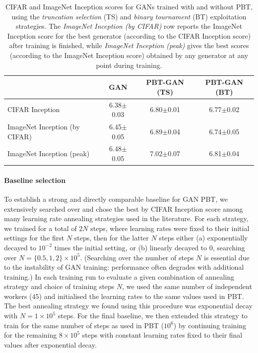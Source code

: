 \begin{appendices}
\begin{table}
    \begin{center}
    \begin{tabular}{lccc}
    \toprule
                                  & \bf{GAN}           & \bf{PBT-GAN (TS)}  & \bf{PBT-GAN (BT)}  \\
    \midrule
    CIFAR Inception               & 6.38$\pm$0.03 & 6.80$\pm$0.01 & 6.77$\pm$0.02          \\
    ImageNet Inception (by CIFAR) & 6.45$\pm$0.05 & 6.89$\pm$0.04 & 6.74$\pm$0.05 \\
    ImageNet Inception (peak)     & 6.48$\pm$0.05 & 7.02$\pm$0.07 & 6.81$\pm$0.04 \\
    \bottomrule
    \end{tabular}
    \end{center}
    \caption{CIFAR and ImageNet Inception scores for GANs trained with and without PBT, using the \emph{truncation selection} (TS) and \emph{binary tournament} (BT) exploitation strategies.
    The \emph{ImageNet Inception (by CIFAR)} row reports the ImageNet Inception score for the best generator (according to the CIFAR Inception score) after training is finished, while \emph{ImageNet Inception (peak)} gives the best scores (according to the ImageNet Inception score) obtained by any generator at any point during training.}
    \label{tab:ganresults}
\end{table}

\paragraph{Baseline selection}
To establish a strong and directly comparable baseline for GAN PBT, we extensively searched over and chose the best by CIFAR Inception score among many learning rate annealing strategies used in the literature.
For each strategy, we trained for a total of $2N$ steps, where learning rates were fixed to their initial settings for the first $N$ steps, then for the latter $N$ steps either (a) exponentially decayed to $10^{-2}$ times the initial setting, or (b) linearly decayed to $0$,
searching over $N=\{0.5, 1, 2\}\times10^5$.
(Searching over the number of steps $N$ is essential due to the instability of GAN training: performance often degrades with additional training.)
In each training run to evaluate a given combination of annealing strategy and choice of training steps $N$,
we used the same number of independent workers ($45$) and initialised the learning rates to the same values used in PBT.
The best annealing strategy we found using this procedure was exponential decay with $N=1\times10^5$ steps.
For the final baseline, we then extended this strategy to train for the same number of steps as used in PBT ($10^6$) by continuing training for the remaining $8\times10^5$ steps with constant learning rates fixed to their final values after exponential decay.


\end{appendices}
